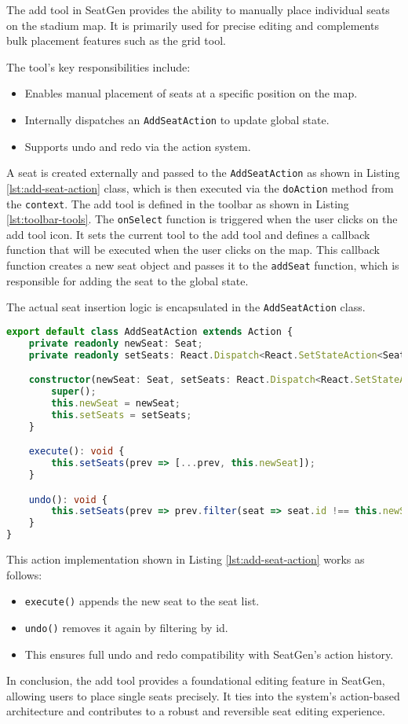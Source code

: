 The add tool in SeatGen provides the ability to manually place individual seats on the stadium map. It is primarily used for precise editing and complements bulk placement features such as the grid tool.

The tool’s key responsibilities include:
\begin{itemize}
    \item Enables manual placement of seats at a specific position on the map.
    \item Internally dispatches an \texttt{AddSeatAction} to update global state.
    \item Supports undo and redo via the action system.
\end{itemize}

A seat is created externally and passed to the \texttt{AddSeatAction} as shown in Listing \ref{lst:add-seat-action} class, which is then executed via the \texttt{doAction} method from the \texttt{context}. The add tool is defined in the toolbar as shown in Listing \ref{lst:toolbar-tools}. The \texttt{onSelect} function is triggered when the user clicks on the add tool icon. It sets the current tool to the add tool and defines a callback function that will be executed when the user clicks on the map. This callback function creates a new seat object and passes it to the \texttt{addSeat} function, which is responsible for adding the seat to the global state.

The actual seat insertion logic is encapsulated in the \texttt{AddSeatAction} class.

\begin{lstlisting}[language=TypeScript, caption=AddSeatAction Implementation, label=lst:add-seat-action]
export default class AddSeatAction extends Action {
    private readonly newSeat: Seat;
    private readonly setSeats: React.Dispatch<React.SetStateAction<Seat[]>>;

    constructor(newSeat: Seat, setSeats: React.Dispatch<React.SetStateAction<Seat[]>>) {
        super();
        this.newSeat = newSeat;
        this.setSeats = setSeats;
    }

    execute(): void {
        this.setSeats(prev => [...prev, this.newSeat]);
    }

    undo(): void {
        this.setSeats(prev => prev.filter(seat => seat.id !== this.newSeat.id));
    }
}
\end{lstlisting}

This action implementation shown in Listing \ref{lst:add-seat-action} works as follows:
\begin{itemize}
    \item \texttt{execute()} appends the new seat to the seat list.
    \item \texttt{undo()} removes it again by filtering by id.
    \item This ensures full undo and redo compatibility with SeatGen’s action history.
\end{itemize}

In conclusion, the add tool provides a foundational editing feature in SeatGen, allowing users to place single seats precisely. It ties into the system's action-based architecture and contributes to a robust and reversible seat editing experience.
